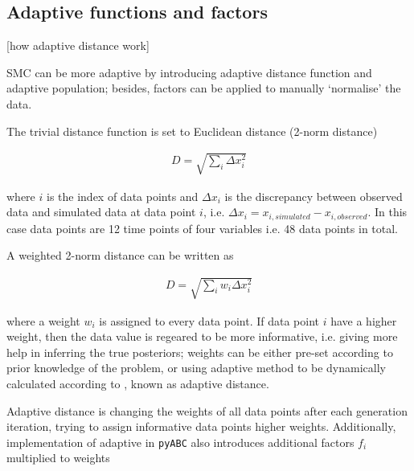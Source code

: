 \documentclass[12pt,a4paper]{report}
\begin{document}
    
    


\subsection{Adaptive functions and factors}

[how adaptive distance work]

SMC can be more adaptive by introducing adaptive distance function and adaptive population; besides, factors can be applied to manually `normalise' the data.

The trivial distance function is set to Euclidean distance (2-norm distance)

\begin{align}
    \label{eq:dis}
    D=\sqrt{\sum_i \Delta x_i^2}
\end{align}

where $i$ is the index of data points and $\Delta x_i$ is the discrepancy between  observed data and simulated data at data point $i$, i.e. $\Delta x_i = x_{i, simulated}-x_{i, observed}$. In this case data points are 12 time points of four variables i.e. 48 data points in total.

A weighted 2-norm distance can be written as 

\begin{align}
    \label{dis_w}
    D=\sqrt{\sum_i w_i \Delta x_i^2}
\end{align}

where a weight $w_i$ is assigned to every data point. If data point $i$ have a higher weight, then the data value is regeared to be more informative, i.e. giving more help in inferring the true posteriors; weights can be either pre-set according to prior knowledge of the problem, or using adaptive method to be dynamically calculated according to , known as adaptive distance. 

Adaptive distance is changing the weights of all data points after each generation iteration, trying to assign informative data points higher weights. Additionally, implementation of adaptive in \verb|pyABC| also introduces additional factors $f_i$ multiplied to weights \cite{ref:adpt_dis} 
\end{document}
